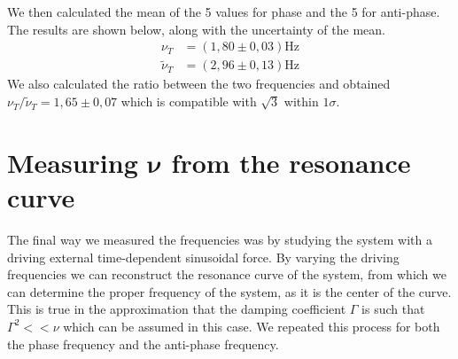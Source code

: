 \documentclass{article}
\begin{document}
We then calculated the mean of the 5 values for phase and the 5 for anti-phase. The results are shown below, along with the uncertainty of the mean. 
\begin{align}
           \nu_T &= (1,80 \pm 0,03) \text{Hz} \\
    \tilde \nu_T &= (2,96 \pm 0,13) \text{Hz}
\end{align}
We also calculated the ratio between the two frequencies and obtained $ \nu_T / \tilde \nu_T = 1,65 \pm 0,07$ which is compatible with $\sqrt 3$ within $1 \sigma$.


\section{Measuring $ \bm \nu $ from the resonance curve}
The final way we measured the frequencies was by studying the system with a driving external time-dependent sinusoidal force. By varying the driving frequencies we can reconstruct the resonance curve of the system, from which we can determine the proper frequency of the system, as it is the center of the curve. This is true in the approximation that the damping coefficient $\Gamma$ is such that $\Gamma^2 << \nu$ which can be assumed in this case. We repeated this process for both the phase frequency and the anti-phase frequency.


\end{document}
